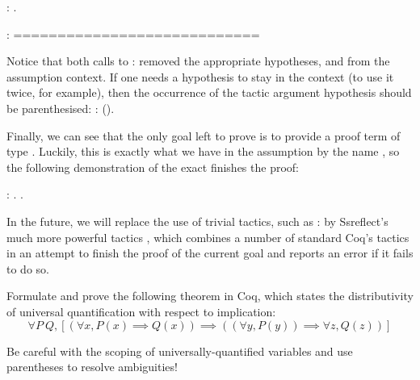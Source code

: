 \begin{coqdoccode}
\coqdocemptyline
\coqdocnoindent
{}: .\coqdoceol
\end{coqdoccode}
\coqdoceol
\coqdocemptyline
\coqdocindent{1.00em}
 : \coqdoceol
\coqdocindent{1.00em}
============================\coqdoceol
\coqdocindent{1.50em}

\coqdocemptyline


Notice that both calls to : removed the appropriate hypotheses,
 and  from the assumption context. If one needs a hypothesis
to stay in the context (to use it twice, for example), then the
occurrence of the tactic argument hypothesis should be parenthesised:
: ().


Finally, we can see that the only goal left to prove is to provide a
proof term of type . Luckily, this is exactly what we have in the
assumption by the name , so the following demonstration of the
exact  finishes the proof:


\begin{coqdoccode}
\coqdocemptyline
\coqdocnoindent
{}: .\coqdoceol
\coqdocnoindent
{}.\coqdoceol
\coqdocemptyline
\end{coqdoccode}


In the future, we will replace the use of trivial tactics, such as
: by Ssreflect's much more powerful tactics , which
combines a number of standard Coq's tactics in an attempt to finish
the proof of the current goal and reports an error if it fails to do
so. 



\begin{exercise}
\label{ex:forall-dist}

Formulate and prove the following theorem in Coq, which states the
distributivity of universal quantification with respect to implication:
\[
\forall P~Q, [(\forall x, P(x) \implies Q(x)) \implies ((\forall y, P(y)) \implies \forall z, Q(z))]
\]

\hint Be careful with the scoping of universally-quantified variables
and use parentheses to resolve ambiguities!

\end{exercise}

\begin{coqdoccode}
\coqdocemptyline
\coqdocemptyline
\end{coqdoccode}


